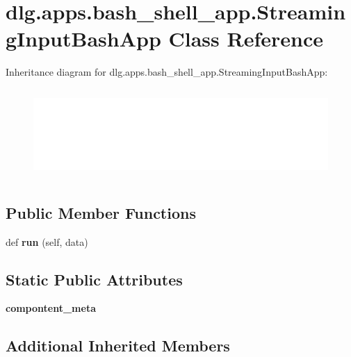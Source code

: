 \hypertarget{classdlg_1_1apps_1_1bash__shell__app_1_1_streaming_input_bash_app}{}\section{dlg.\+apps.\+bash\+\_\+shell\+\_\+app.\+Streaming\+Input\+Bash\+App Class Reference}
\label{classdlg_1_1apps_1_1bash__shell__app_1_1_streaming_input_bash_app}
Inheritance diagram for dlg.\+apps.\+bash\+\_\+shell\+\_\+app.\+Streaming\+Input\+Bash\+App\+:\begin{figure}[H]
\begin{center}
\leavevmode
\includegraphics[height=3.435583cm]{classdlg_1_1apps_1_1bash__shell__app_1_1_streaming_input_bash_app}
\end{center}
\end{figure}
\subsection*{Public Member Functions}
\begin{DoxyCompactItemize}
\item 
\mbox{\label{classdlg_1_1apps_1_1bash__shell__app_1_1_streaming_input_bash_app_a0d3a78123d703506b5f4f3dc22adcdde}} 
def {\bfseries run} (self, data)
\end{DoxyCompactItemize}
\subsection*{Static Public Attributes}
\begin{DoxyCompactItemize}
\item 
{\bfseries compontent\+\_\+meta}
\end{DoxyCompactItemize}
\subsection*{Additional Inherited Members}


